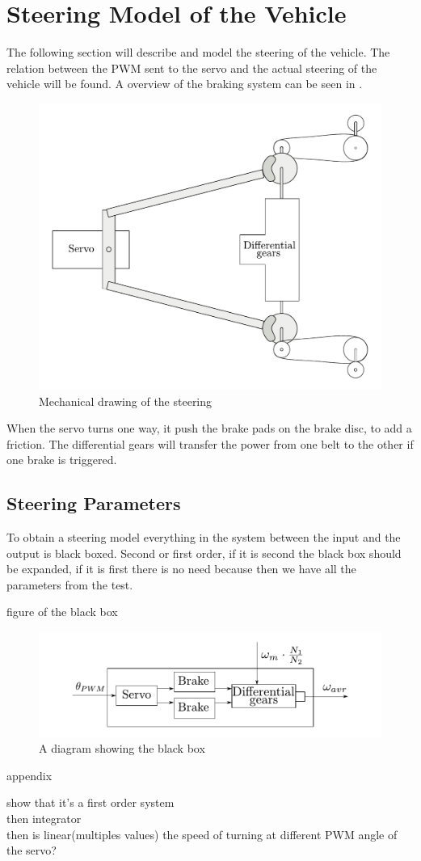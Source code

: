 \section{Steering Model of the Vehicle}\label{sec:SteeringModel}
The following section will describe and model the steering of the vehicle. The relation between the PWM sent to the servo and the actual steering of the vehicle will be found. A overview of the braking system can be seen in .

 \begin{figure}[H]
 	\centering
 	\includegraphics[scale=0.6]{figures/steeringMechanical.pdf}
 	\caption{Mechanical drawing of the steering}
 	\label{steeringMechanical}
 \end{figure}

When the servo turns one way, it push the brake pads on the brake disc, to add a friction. The differential gears will transfer the power from one belt to the other if one brake is triggered.

\subsection{Steering Parameters}
 To obtain a steering model everything in the system between the input and the output is black boxed. Second or first order, if it is second the black box should be expanded, if it is first there is no need because then we have all the parameters from the test.
 
 figure of the black box
 \begin{figure}[H]
 	\centering
 	\includegraphics[scale=1]{figures/steeringDiagramBlackBox.pdf}
 	\caption{A diagram showing the black box}
 	\label{steeringDiagramBlackBox}
 \end{figure}
 
 appendix
 
show that it's a first order system\\
then integrator\\
then is linear(multiples values) the speed of turning at different PWM angle of the servo?
